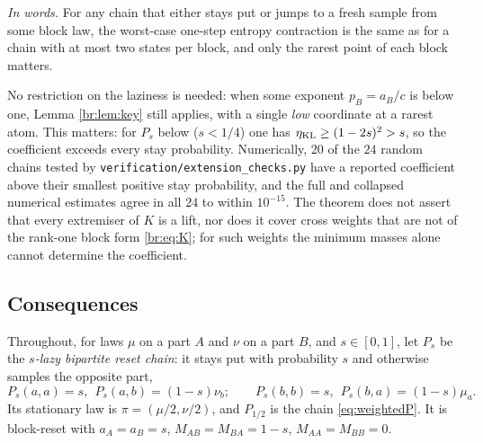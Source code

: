 \noindent\textit{In words.} For any chain that either stays put or jumps to a
fresh sample from some block law, the worst-case one-step entropy
contraction is the same as for a chain with at most two states per block,
and only the rarest point of each block matters.

\begin{remark}\label{br:rem:norestriction}
No restriction on the laziness is needed: when some exponent
\(p_B=a_B/c\) is below one, Lemma \ref{br:lem:key} still applies, with a
single \emph{low} coordinate at a rarest atom.
This matters: for \(P_s\) below (\(s<1/4\)) one has
\(\eta_{\mathrm{KL}}\ge(1-2s)^2>s\), so the coefficient exceeds every stay
probability. Numerically, \(20\) of the \(24\) random chains tested by
\texttt{verification/extension\_checks.py} have a reported coefficient above
their smallest positive stay probability, and the full and collapsed
numerical estimates agree in all \(24\) to within \(10^{-15}\). The theorem does not assert that every extremiser of
\(K\) is a lift, nor does it cover cross weights that are not of the
rank-one block form \eqref{br:eq:K}; for such weights the minimum masses
alone cannot determine the coefficient.
\end{remark}

\subsection{Consequences}

Throughout, for laws \(\mu\) on a part \(A\) and \(\nu\) on a part \(B\),
and \(s\in[0,1]\), let \(P_s\) be the \emph{\(s\)-lazy bipartite reset chain}:
it stays put with probability \(s\) and otherwise samples the opposite part,
\[
P_s(a,a)=s,\ \ P_s(a,b)=(1-s)\nu_b;\qquad
P_s(b,b)=s,\ \ P_s(b,a)=(1-s)\mu_a .
\]
Its stationary law is \(\pi=(\mu/2,\nu/2)\), and \(P_{1/2}\) is the chain
\eqref{eq:weightedP}. It is block-reset with \(a_A=a_B=s\),
\(M_{AB}=M_{BA}=1-s\), \(M_{AA}=M_{BB}=0\).

